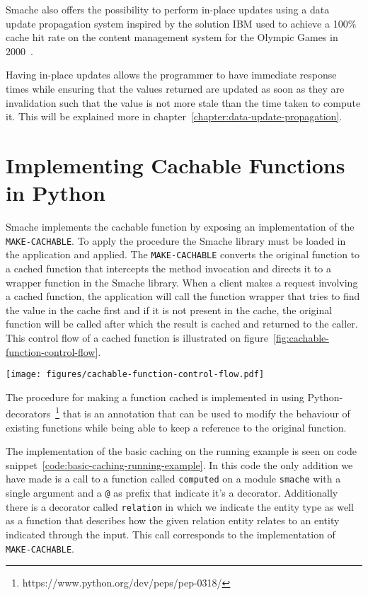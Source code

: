 Smache also offers the possibility to perform in-place updates using a data update propagation system inspired by the solution IBM used to achieve a 100\% cache hit rate on the content management system for the Olympic Games in 2000~\cite{paper:ibm, paper:ibm-extended}.

Having in-place updates allows the programmer to have immediate response times while ensuring that the values returned are updated as soon as they are invalidation such that the value is not more stale than the time taken to compute it. This will be explained more in chapter~\ref{chapter:data-update-propagation}.


\section{Implementing Cachable Functions in Python}
\label{sec:implementing_cachable_functions_in_python}

Smache implements the cachable function by exposing an implementation of the \verb$MAKE-CACHABLE$. To apply the procedure the Smache library must be loaded in the application and applied. The \verb$MAKE-CACHABLE$ converts the original function to a cached function that intercepts the method invocation and directs it to a wrapper function in the Smache library. When a client makes a request involving a cached function, the application will call the function wrapper that tries to find the value in the cache first and if it is not present in the cache, the original function will be called after which the result is cached and returned to the caller. This control flow of a cached function is illustrated on figure~\ref{fig:cachable-function-control-flow}.

\begin{figure*}[ht!]
  \centering
  \texttt{[image: figures/cachable-function-control-flow.pdf]}
  \caption{The control flow during a call to a function cached through Smache}
  \label{fig:cachable-function-control-flow}
\end{figure*}

The procedure for making a function cached is implemented in using Python-decorators~\footnote{https://www.python.org/dev/peps/pep-0318/} that is an annotation that can be used to modify the behaviour of existing functions while being able to keep a reference to the original function.

The implementation of the basic caching on the running example is seen on code snippet~\ref{code:basic-caching-running-example}. In this code the only addition we have made is a call to a function called \verb$computed$ on a module \verb$smache$ with a single argument and a \verb$@$ as prefix that indicate it's a decorator. Additionally there is a decorator called \verb$relation$ in which we indicate the entity type as well as a function that describes how the given relation entity relates to an entity indicated through the input. This call corresponds to the implementation of \verb$MAKE-CACHABLE$.

